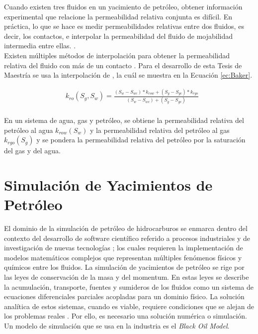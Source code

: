 Cuando existen tres fluidos en un yacimiento de petróleo, obtener información experimental que relacione la permeabilidad relativa conjunta es difícil. En práctica, lo que se hace es medir permeabilidades relativas entre dos fluidos, es decir, los contactos, e interpolar la permeabilidad del fluido de mojabilidad intermedia entre ellas. \citep{Zuo2014}.\\

Existen múltiples métodos de interpolación para obtener la permeabilidad relativa del fluido con más de un contacto \citep{Delshad1989, Blunt2000, Zuo2014}. Para el desarrollo de esta Tesis de Maestría se usa la interpolación de \cite{Baker1988}, la cuál se muestra en la Ecuación \ref{ec:Baker}.

\begin{align}
	\label{ec:Baker}&k_{ro}(S_{g}, S_{w}) = \frac{\left(S_{w}-S_{wc}\right)*k_{row} + \left(S_{g}-S_{gc}\right)*k_{rgo}}{\left(S_{w}-S_{wc}\right) + \left(S_{g}-S_{gc}\right)}
\end{align}\\

En un sistema de agua, gas y petróleo, se obtiene la permeabilidad relativa del petróleo al agua $k_{row}(S_{w})$ y la permeabilidad relativa del petróleo al gas $k_{rgo}(S_{g})$ y se pondera la permeabilidad relativa del petróleo por la saturación del gas y del agua.

\section{Simulación de Yacimientos de Petróleo}
El dominio de la simulación de petróleo de hidrocarburos se enmarca dentro del contexto del desarrollo de software científico referido a procesos industriales y de investigación de nuevas tecnologías \citep{Kelly2015}; los cuales requieren la implementación de modelos matemáticos complejos que representan múltiples fenómenos físicos y químicos entre los fluidos. La simulación de yacimientos de petróleo se rige por las leyes de conservación de la masa y del momentum. En estas leyes se describe la acumulación, transporte, fuentes y sumideros de los fluidos como un sistema de ecuaciones diferenciales parciales acopladas para un dominio físico. La solución analítica de estos sistemas, cuando es viable, requiere condiciones que se alejan de los problemas reales \citep{ertekin2001basic}. Por ello, es necesario una solución numérica o simulación. Un modelo de simulación que se usa en la industria es el \textit{Black Oil Model}.%


